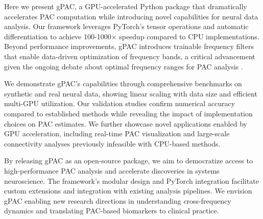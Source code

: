 Here we present gPAC, a GPU-accelerated Python package that dramatically accelerates PAC computation while introducing novel capabilities for neural data analysis. Our framework leverages PyTorch's tensor operations and automatic differentiation to achieve 100-1000× speedup compared to CPU implementations. Beyond performance improvements, gPAC introduces trainable frequency filters that enable data-driven optimization of frequency bands, a critical advancement given the ongoing debate about optimal frequency ranges for PAC analysis \citep{Aru2015}.

We demonstrate gPAC's capabilities through comprehensive benchmarks on synthetic and real neural data, showing linear scaling with data size and efficient multi-GPU utilization. Our validation studies confirm numerical accuracy compared to established methods while revealing the impact of implementation choices on PAC estimates. We further showcase novel applications enabled by GPU acceleration, including real-time PAC visualization and large-scale connectivity analyses previously infeasible with CPU-based methods.

By releasing gPAC as an open-source package, we aim to democratize access to high-performance PAC analysis and accelerate discoveries in systems neuroscience. The framework's modular design and PyTorch integration facilitate custom extensions and integration with existing analysis pipelines. We envision gPAC enabling new research directions in understanding cross-frequency dynamics and translating PAC-based biomarkers to clinical practice.